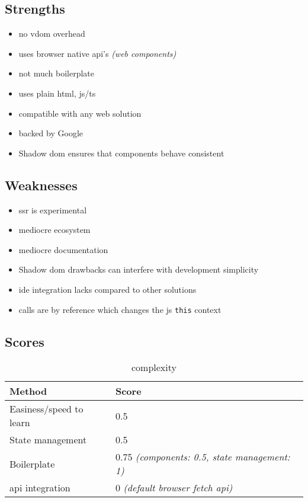 \subsection{Strengths}
\label{subsec:lit:strengths}
\begin{itemize}
    \item no \acrshort{vdom} overhead
    \item uses browser native \acrshort{api}'s \textit{(web components)}
    \item not much boilerplate
    \item uses plain \acrshort{html}, \acrshort{js}/\acrshort{ts}
    \item compatible with any web solution
    \item backed by Google
    \item Shadow \acrshort{dom} ensures that components behave consistent
\end{itemize}

\subsection{Weaknesses}
\label{subsec:lit:weaknesses}
\begin{itemize}
    \item \acrshort{ssr} is experimental
    \item mediocre ecosystem
    \item mediocre documentation
    \item Shadow \acrshort{dom} drawbacks can interfere with development simplicity
    \item \acrshort{ide} integration lacks compared to other solutions
    \item calls are by reference which changes the \acrshort{js} \texttt{this} context
\end{itemize}


\subsection{Scores}
\label{subsec:lit:scores}

\begin{table}[H]
    \centering
    \begin{tabular}{|l|l|}
        \hline
        \textbf{Method}            & \textbf{Score}                                       \\
        \hline
        Easiness/speed to learn    & 0.5                                                  \\ \hline
        State management           & 0.5                                                  \\ \hline
        Boilerplate                & 0.75 \textit{(components: 0.5, state management: 1)} \\ \hline
        \acrshort{api} integration & 0 \textit{(default browser fetch \acrshort{api})}    \\ \hline
    \end{tabular}
    \caption{complexity}
    \label{tab:lit:complexity}
\end{table}


